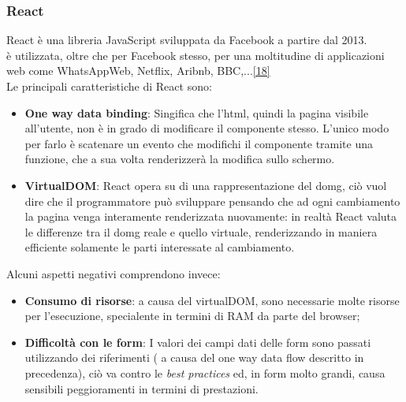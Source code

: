\subsubsection{React}
React è una libreria JavaScript sviluppata da Facebook a partire dal 2013.\\
è utilizzata, oltre che per Facebook stesso, per una moltitudine di applicazioni web come WhatsAppWeb, Netflix, Aribnb, BBC,...\hyperlink{18}{[18]}\\
Le principali caratteristiche di React sono:
\begin{itemize}
	\item \textbf{One way data binding}: Singifica che l'\gls{html}, quindi la pagina visibile all'utente, non è in grado di modificare il componente stesso. L'unico modo per farlo è scatenare un evento che modifichi il componente tramite una funzione, che a sua volta renderizzerà la modifica sullo schermo.
	\item \textbf{VirtualDOM}: React opera su di una rappresentazione del \gls{domg}\glsfirstoccur, ciò vuol dire che il programmatore può sviluppare pensando che ad ogni cambiamento la pagina venga interamente renderizzata nuovamente: in realtà React valuta le differenze tra il \gls{domg} reale e quello virtuale, renderizzando in maniera efficiente solamente le parti interessate al cambiamento.
\end{itemize}
Alcuni aspetti negativi comprendono invece:
\begin{itemize}
	\item \textbf{Consumo di risorse}: a causa del virtualDOM, sono necessarie molte risorse per l'esecuzione, specialente in termini di RAM da parte del browser;
	\item \textbf{Difficoltà con le form}: I valori dei campi dati delle form sono passati utilizzando dei riferimenti ( a causa del one way data flow descritto in precedenza), ciò va contro le \emph{best practices} ed, in form molto grandi, causa sensibili peggioramenti in termini di prestazioni.
\end{itemize}

